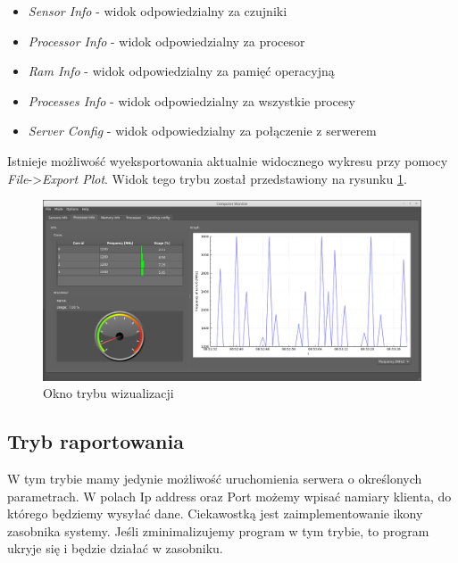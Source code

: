 \documentclass[a4paper]{article}
\begin{document}
\begin{itemize}
	\item \textit{Sensor Info} - widok odpowiedzialny za czujniki
	\item \textit{Processor Info} - widok odpowiedzialny za procesor
	\item \textit{Ram Info} - widok odpowiedzialny za pamięć operacyjną
	\item \textit{Processes Info} - widok odpowiedzialny za wszystkie procesy
	\item \textit{Server Config} - widok odpowiedzialny za połączenie z serwerem
\end{itemize}
Istnieje możliwość wyeksportowania aktualnie widocznego wykresu przy pomocy \textit{File}->\textit{Export Plot}. Widok tego trybu został przedstawiony na rysunku \ref{okno_trybu_wizualizacji}.

\begin{figure}[H]
	\centering
	\includegraphics[height=0.25\paperheight]{img/oknoTrybuWizualizacji.png}
	\caption{Okno trybu wizualizacji}
	\label{okno_trybu_wizualizacji}
\end{figure}

\subsection{Tryb raportowania}
W tym trybie mamy jedynie możliwość uruchomienia serwera o określonych parametrach. W polach Ip address oraz Port możemy wpisać namiary klienta, do którego będziemy wysyłać dane. Ciekawostką jest zaimplementowanie ikony zasobnika systemy. Jeśli zminimalizujemy program w tym trybie, to program ukryje się i będzie działać w zasobniku.
\end{document}
